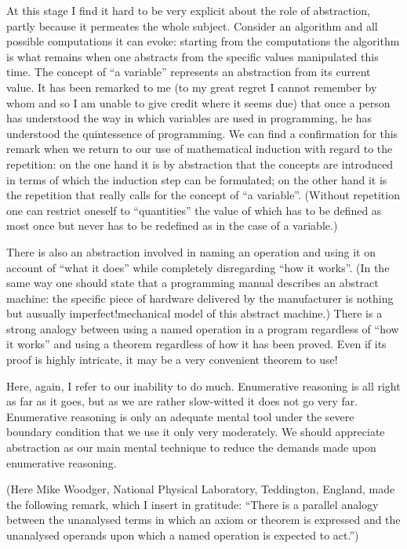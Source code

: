 At this stage I find it hard to be very explicit about the role of abstraction, partly because it permeates the whole subject. Consider an algorithm and all possible computations it can evoke: starting from the computations the algorithm is what remains when one abstracts from the specific values manipulated this time. The concept of ``a variable'' represents an abstraction from its current value. It has been remarked to me (to my great regret I cannot remember by whom and so I am unable to give credit where it seems due) that once a person has understood the way in which variables are used in programming, he has understood the quintessence of programming. We can find a confirmation for this remark when we return to our use of mathematical induction with regard to the repetition: on the one hand it is by abstraction that the concepts are introduced in terms of which the induction step can be formulated; on the other hand it is the repetition that really calls for the concept of ``a variable''. (Without repetition one can restrict oneself to ``quantities'' the value of which has to be defined as most once but never has to be redefined as in the case of a variable.)

There is also an abstraction involved in naming an operation and using it on account of ``what it does'' while completely disregarding ``how it works''. (In the same way one should state that a programming manual describes an abstract machine: the specific piece of hardware delivered by the manufacturer is nothing but a\textemdash{}usually imperfect!\textemdash{}mechanical model of this abstract machine.) There is a strong analogy between using a named operation in a program regardless of ``how it works'' and using a theorem regardless of how it has been proved. Even if its proof is highly intricate, it may be a very convenient theorem to use!

Here, again, I refer to our inability to do much. Enumerative reasoning is all right as far as it goes, but as we are rather slow-witted it does not go very
far. Enumerative reasoning is only an adequate mental tool under the severe boundary condition that we use it only very moderately. We should appreciate
abstraction as our main mental technique to reduce the demands made upon enumerative reasoning.

(Here Mike Woodger, National Physical Laboratory, Teddington, England, made the following remark, which I insert in gratitude: ``There is a parallel analogy between the unanalysed terms in which an axiom or theorem is expressed and the unanalysed operands upon which a named operation is expected to act.'')

